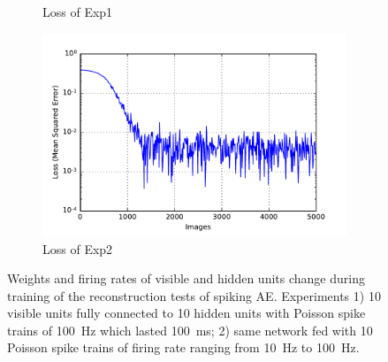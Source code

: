 \begin{figure}
\begin{subfigure}[t]{0.4\textwidth}
		\caption{Loss of Exp1}
	\end{subfigure}
	\begin{subfigure}[t]{0.4\textwidth}
		\includegraphics[width=\textwidth]{pics_sdlm/07_exp_SAE_all_long/exp2_mse_nons.pdf}
		\caption{Loss of Exp2}
	\end{subfigure}
	\caption{Weights and firing rates of visible and hidden units change during training of the reconstruction tests of spiking AE. 
		Experiments 1) 10 visible units fully connected to 10 hidden units with Poisson spike trains of 100~Hz which lasted 100~ms; 2) same network fed with 10 Poisson spike trains of firing rate ranging from 10~Hz to 100~Hz.}
\end{figure}


